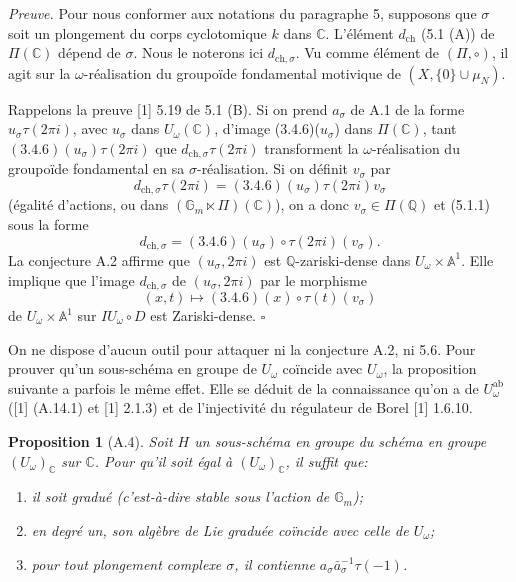\documentclass[10pt,a4paper]{article}
\newcommand{\Gm}{\mathbb G_m}
\newcommand{\Q}{\mathbb Q}
\newcommand{\A}{\mathbb A}
\newcommand{\C}{\mathbb C}
\theoremstyle{deligne}
\newtheorem*{proposition*}{Proposition}
\newenvironment{proofdel}{\textit{Preuve.}}{\hfill$\square$}
\newcommand{\heading}[1]{\vspace{0.65em}\noindent{\bfseries #1}\quad}
\begin{document}
\begin{proofdel}
Pour nous conformer aux notations du paragraphe 5, supposons que \(\sigma\) soit un plongement du corps cyclotomique \(k\) dans \(\C\). L'élément \(d_{\mathrm{ch}}\) (5.1 (A)) de \(\Pi(\C)\) dépend de \(\sigma\). Nous le noterons ici \(d_{\mathrm{ch},\sigma}\). Vu comme élément de \((\Pi,\circ)\), il agit sur la \(\omega\)-réalisation du groupoïde fondamental motivique de \((X,\{0\}\cup\mu_N)\).

Rappelons la preuve [1] 5.19 de 5.1 (B). Si on prend \(a_\sigma\) de A.1 de la forme \(u_\sigma\tau(2\pi i)\), avec \(u_\sigma\) dans \(U_\omega(\C)\), d'image (3.4.6)(\(u_\sigma\)) dans \(\Pi(\C)\), tant \((3.4.6)(u_\sigma)\tau(2\pi i)\) que \(d_{\mathrm{ch},\sigma}\tau(2\pi i)\) transforment la \(\omega\)-réalisation du groupoïde fondamental en sa \(\sigma\)-réalisation. Si on définit \(v_\sigma\) par
\[
d_{\mathrm{ch},\sigma}\tau(2\pi i)=(3.4.6)(u_\sigma)\tau(2\pi i)v_\sigma
\]
(égalité d'actions, ou dans \((\Gm\ltimes\Pi)(\C)\)), on a donc \(v_\sigma\in\Pi(\Q)\) et (5.1.1) sous la forme
\[
\tag{A.3.1}
d_{\mathrm{ch},\sigma}=(3.4.6)(u_\sigma)\circ\tau(2\pi i)(v_\sigma).
\]
La conjecture A.2 affirme que \((u_\sigma,2\pi i)\) est \(\Q\)-zariski-dense dans \(U_\omega\times\A^1\). Elle implique que l'image \(d_{\mathrm{ch},\sigma}\) de \((u_\sigma,2\pi i)\) par le morphisme
\[
(x,t)\longmapsto(3.4.6)(x)\circ\tau(t)(v_\sigma)
\]
de \(U_\omega\times\A^1\) sur \(IU_\omega\circ D\) est Zariski-dense.
\end{proofdel}

\heading{A.4.} On ne dispose d'aucun outil pour attaquer ni la conjecture A.2, ni 5.6. Pour prouver qu'un sous-schéma en groupe de \(U_\omega\) coïncide avec \(U_\omega\), la proposition suivante a parfois le même effet. Elle se déduit de la connaissance qu'on a de \(U_\omega^{\mathrm{ab}}\) ([1] (A.14.1) et [1] 2.1.3) et de l'injectivité du régulateur de Borel [1] 1.6.10.

\begin{proposition*}[A.4]
Soit \(H\) un sous-schéma en groupe du schéma en groupe \((U_\omega)_\C\) sur \(\C\). Pour qu'il soit égal à \((U_\omega)_\C\), il suffit que:
\begin{enumerate}[label=(\alph*)]
\item il soit gradué (c'est-à-dire stable sous l'action de \(\Gm\));
\item en degré un, son algèbre de Lie graduée coïncide avec celle de \(U_\omega\);
\item pour tout plongement complexe \(\sigma\), il contienne \(a_\sigma\bar a_\sigma^{-1}\tau(-1)\).
\end{enumerate}
\end{proposition*}
\end{document}

